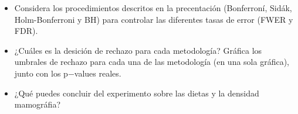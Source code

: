 \documentclass[11pt,letterpaper]{article}
\begin{document}
\begin{itemize}
    \item Considera los procedimientos descritos en la precentación (Bonferroní, Sidák, Holm-Bonferroni y BH) para controlar las diferentes tasas de error (FWER y FDR).
    
    \item ¿Cuáles es la desición de rechazo para cada metodología? Gráfica los umbrales de rechazo para cada una de las metodología (en una sola gráfica), junto con los p$-$values reales.
    
    \item ¿Qué puedes concluir del experimento sobre las dietas y la densidad mamográfia? 
\end{itemize}

\newpage


\printbibliography
\end{document}

